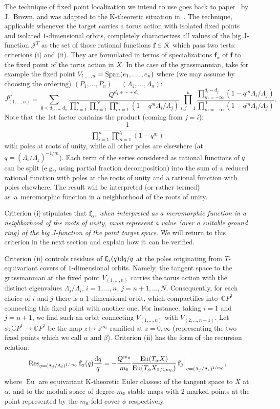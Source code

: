 \documentclass[10pt,a4paper]{amsart}
\numberwithin{equation}{section}
\def\K{\mathcal K}
\def\J{\mathcal J}
\def\CC{\mathbb C}
\def\Res{\operatorname{Res}}
\def\a{\alpha}
\def\b{\beta}
\def\f{{\mathbf f}}
\def\Eu{\operatorname{Eu}}
\theoremstyle{definition}
\theoremstyle{plain}
\begin{document}
The technique of fixed point localization we intend to use goes back to paper~\cite{Jeff_Brown} by
J.~Brown, and was adapted to the K-theoretic situation in~\cite{Givental:perm2}. The technique, applicable whenever the target carries a torus action with isolated fixed points and isolated $1$-dimensional orbits, completely characterizes all values of the big J-function $\J^T$ as the set of those rational functions $\f\in \K$ which pass two tests: criterions (i) and (ii). They are formulated in terms of specializations $\f_{\a}$ of $\f$ to the fixed point of the torus action in $X$. In the case of the grassmannian, take for example the fixed point $V_{1,\dots,n}=\mathop{\rm Span}(e_1,\dots,e_n)$ where (we may assume by choosing the ordering) $(P_1,\dots,P_n)=(\Lambda_1,\dots,\Lambda_n)$:
\[
J^T_{(1,\dots,n)}= \sum_{0\leq d_1,\dots,d_n} \frac{Q^{d_1+\cdots+d_n}}{\prod_{i=1}^n\prod_{j=1}^N\prod_{m=1}^{d_i}(1-q^m\Lambda_i/\Lambda_j)} \prod_{i,j=1}^n\frac{\prod_{m=-\infty}^{d_i-d_j}(1-q^m\Lambda_i/\Lambda_j)} {\prod_{m=-\infty}^0(1-q^m\Lambda_i/\Lambda_j)}.
\]
Note that the 1st factor contains the product (coming from $j=i$):
\[
\frac{1}{\prod_{i=1}^n \prod_{m=1}^{d_i}(1-q^m)}
\]
with poles at roots of unity, while all other poles are elsewhere (at $q=(\Lambda_i/\Lambda_j)^{-1/m}$). Each term of the series considered as rational functions of $q$ can be split (e.g., using partial fraction decomposition) into the sum of a reduced rational function with poles at the roots of unity and a rational function with poles elsewhere. The result will be interpreted (or rather termed) as~a~mero\-mor\-phic function in a neighborhood of the roots of unity.

Criterion (i) stipulates that {\em $\f_\a$, when interpreted as a meromorphic function in a neighborhood of the roots of unity, must represent a value (over a suitable ground ring) of the big J-function of the point target space.} We will return to this criterion in the next section and explain how it~can be verified.

Criterion (ii) controls residues of $\f_\a(q){\rm d}q/q$ at the poles originating from $T$-equivariant covers of $1$-dimensional orbits. Namely, the tangent space to the grassmannian at the fixed point $V_{(1,\dots,n)}$ carries the torus action with the distinct eigenvalues $\Lambda_j/\Lambda_i$, $i=1,\dots,n$, $j=n+1,\dots,N$. Consequently, for each choice of $i$ and $j$ there is a $1$-dimensional orbit, which
compactifies into~$\CC P^1$ connecting this fixed point with another one. For instance, taking $i=1$ and $j=n+1$, we find such an orbit connecting $V_{(1,\dots,n)}$ with $V_{(2,\dots,n+1)}$. Let $\phi\colon \CC P^1\to \CC P^1$ be the map $z\mapsto z^{m_0}$ ramified at $z=0,\infty$ (representing the two fixed points which we call $\a$ and $\b$). Criterion (ii) has the form of the recursion relation:
\[
\Res_{q=(\Lambda_j/\Lambda_i)^{1/m_0}}\f_\a(q) \frac{{\rm d}q}{q} = -\frac{Q^{m_0}}{m_0}
\frac{\Eu(T_\a X)}{\Eu(T_{\phi}X_{0,2,m_0})} \, \f_{\b}\Big|_{q=(\Lambda_j/\Lambda_i)^{1/m_0}},
\]
where $\Eu$ are equivariant K-theoretic Euler classes: of the tangent space to $X$ at $\a$, and to the moduli space of degree-$m_0$ stable maps with 2 marked points at the point represented by the $m_0$-fold cover $\phi$ respectively.
\end{document}
